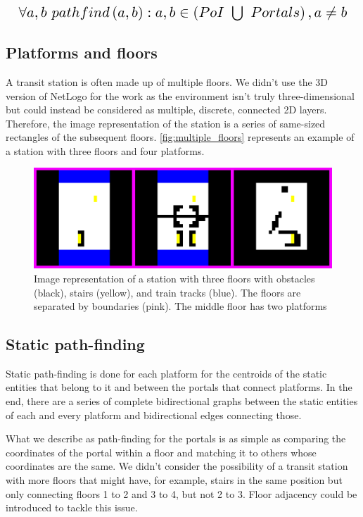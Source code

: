 \begin{equation} \label{equation:bidirectional_pathfinding}
\resizebox{\columnwidth}{!}{
    $\forall{a, b}\ pathfind\left(a, b\right): a, b \in \left(PoI\ \bigcup\ Portals\right) , a \ne b$
}
\end{equation}

\subsection{Platforms and floors}
A transit station is often made up of multiple floors. We didn't use the 3D version of NetLogo for the work as the environment isn't truly three-dimensional but could instead be considered as multiple, discrete, connected 2D layers. Therefore, the image representation of the station is a series of same-sized rectangles of the subsequent floors. \autoref{fig:multiple_floors} represents an example of a station with three floors and four platforms.

\begin{figure}[H]
    \centering
    \includegraphics[width=\columnwidth]{assets/multiple_floors.png}
    \caption{Image representation of a station with three floors with obstacles (black), stairs (yellow), and train tracks (blue). The floors are separated by boundaries (pink). The middle floor has two platforms}
    \label{fig:multiple_floors}
\end{figure}

\subsection{Static path-finding}\label{sec:methods_materials_static_pathfinding}

Static path-finding is done for each platform for the centroids of the static entities that belong to it and between the portals that connect platforms. In the end, there are a series of complete bidirectional graphs between the static entities of each and every platform and bidirectional edges connecting those. 

What we describe as path-finding for the portals is as simple as comparing the coordinates of the portal within a floor and matching it to others whose coordinates are the same. We didn't consider the possibility of a transit station with more floors that might have, for example, stairs in the same position but only connecting floors 1 to 2 and 3 to 4, but not 2 to 3. Floor adjacency could be introduced to tackle this issue.

